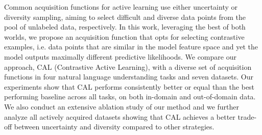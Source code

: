 Common acquisition functions for active learning use either uncertainty or diversity sampling, aiming to select difficult and diverse data points from the pool of unlabeled data, respectively. In this work, leveraging the best of both worlds, we propose an acquisition function that opts for selecting contrastive examples, i.e. data points that are similar in the model feature space and yet the model outputs maximally different predictive likelihoods. We compare our approach, CAL (Contrastive Active Learning), with a diverse set of acquisition functions in four natural language understanding tasks and seven datasets. Our experiments show that CAL performs consistently better or equal than the best performing baseline across all tasks, on both in-domain and out-of-domain data. We also conduct an extensive ablation study of our method and we further analyze all actively acquired datasets showing that CAL achieves a better trade-off between uncertainty and diversity compared to other strategies.
